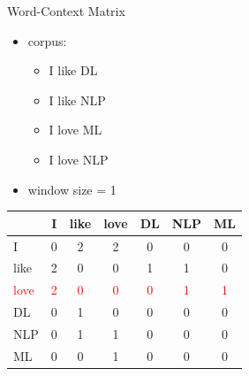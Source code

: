 \documentclass[12pt, handout]{beamer}
\begin{document}
\begin{frame}{Word-Context Matrix}
	\begin{itemize}
		\item corpus:
		\begin{itemize}
			\item I like DL
			\item I like NLP
			\item I love ML
			\item I love NLP
		\end{itemize}
		\item window size = 1
		
	\end{itemize}
	{
		\begin{table}[!h]
			\centering
			\begin{tabular}{l|cccccc}
				&  I & like & love & DL & NLP &ML  \\
				\hline
				I & 0 & 2 & 2 & 0 &0 &0  \\
				\textcolor{myblue}{like} & \textcolor{myblue}{2} & \textcolor{myblue}{0} & \textcolor{myblue}{0} & \textcolor{myblue}{1} & \textcolor{myblue}{1} & \textcolor{myblue}{0} \\
				\textcolor{red}{love} & \textcolor{red}{2} & \textcolor{red}{0} & \textcolor{red}{0} & \textcolor{red}{0} & \textcolor{red}{1} & \textcolor{red}{1} \\
				DL & 0 & 1 & 0 & 0 & 0 & 0 \\
				NLP & 0 & 1 & 1 & 0 & 0  & 0\\
				ML & 0 & 0 & 1 & 0 & 0 & 0\\
				\hline
			\end{tabular}
		\end{table}
	}
\end{frame}
\end{document}
